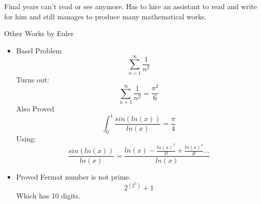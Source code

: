 \documentclass{report}
\begin{document}
\begin{description}
\begin{mdframed}
\begin{itemize}
\begin{mdframed}
                        Final years can't read or see anymore.
                        Has to hire an assistant to read and
                        write for him and still manages to
                        produce many mathematical works.
                    \end{mdframed}
            \end{itemize}
            \pagebreak
            Other Works by Euler
            \begin{itemize}
                \item Basel Problem
                    \begin{displaymath}
                        \sum_{n=1}^{\infty} \frac{1}{n^2}
                    \end{displaymath}
                    Turns out:
                    \begin{displaymath}
                        \sum_{n=1}^{\infty} \frac{1}{n^2}
                        = \frac{\pi^2}{6}
                    \end{displaymath}
                    Also Proved
                    \begin{displaymath}
                        \int_0^1 \frac{sin(ln(x))}{ln(x)}
                        = \frac{\pi}{4}
                    \end{displaymath}
                    Using:
                    \begin{displaymath}
                        \frac{sin(ln(x))}{ln(x)}
                        = \frac{ln(x)-\frac{ln(x)^3}{3!} +
                        \frac{ln(x)^4}{4!}...}{ln(x)}
                    \end{displaymath}
                    
                \item Proved Fermat number is not prime. 
                    \begin{displaymath}
                        2^{(2^5)}+1
                    \end{displaymath}
                    Which has 10 digits.
                    

\end{itemize}
\end{mdframed}
\end{description}
\end{document}
